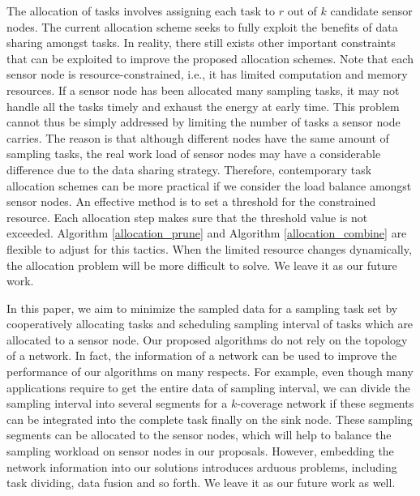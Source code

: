 \documentclass[prodmode,acmtosn]{acmsmall}
\begin{document}
The allocation of tasks involves assigning each task to $r$ out of $k$ candidate sensor nodes. The current allocation scheme seeks to fully exploit the benefits of data sharing amongst tasks. In reality, there still exists other important constraints that can be exploited to improve the proposed allocation schemes. Note that each sensor node is resource-constrained, i.e., it has limited computation and memory resources. If a sensor node has been allocated many sampling tasks, it may not handle all the tasks timely and exhaust the energy at early time. This problem cannot thus be simply addressed by limiting the number of tasks a sensor node carries. The reason is that although different nodes have the same amount of sampling tasks, the real work load of  sensor nodes may have a considerable difference due to the data sharing strategy. Therefore, contemporary task allocation schemes can be more practical if we consider the load balance amongst sensor nodes. An effective method is to set a threshold for the constrained resource. Each allocation step makes sure that the threshold value is not exceeded. Algorithm \ref{allocation_prune} and Algorithm \ref{allocation_combine} are flexible to adjust for this tactics. When the  limited resource changes dynamically, the allocation problem will be more difficult to solve. We leave it as our future work.

In this paper, we aim to minimize the sampled data for a sampling task set by cooperatively allocating tasks and scheduling sampling interval of tasks which are allocated to a sensor node. Our proposed algorithms do not rely on the topology of a network. In fact, the information of a network can be used to improve the performance of our algorithms on many respects. For example, even though many applications require to get the entire data of sampling interval, we can divide the sampling interval into several segments for a $k$-coverage network if these segments can be integrated into the complete task finally on the sink node. These sampling segments can be allocated to the sensor nodes, which will help to balance the sampling workload on sensor nodes in our proposals. However, embedding the network information into our solutions introduces arduous problems, including task dividing, data fusion and so forth. We leave it as our future work as well.
\end{document}
